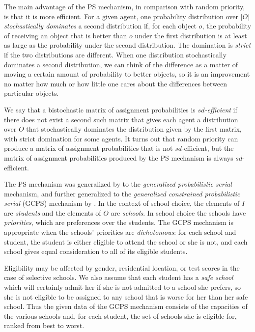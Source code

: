 \documentclass[12pt]{article}
\theoremstyle{definition}
\begin{document}
The main advantage of the PS mechanism, in comparison with random
priority, is that it is more efficient.  For a given agent, one
probability distribution over $|O|$ \emph{stochastically dominates} a
second distribution if, for each object $o$, the probability of
receiving an object that is better than $o$ under the first
distribution is at least as large as the probability under the second
distribution.  The domination is \emph{strict} if the two
distributions are different. When one distribution stochastically
dominates a second distribution, we can think of the difference as a
matter of moving a certain amount of probability to better objects, so
it is an improvement no matter how much or how little one cares about
the differences between particular objects.

We say that a bistochastic matrix of assignment probabilities is
\emph{$sd$-efficient} if there does not exist a second such matrix
that gives each agent a distribution over $O$ that stochastically
dominates the distribution given by the first matrix, with strict
domination for some agents.  It turns out that random priority can
produce a matrix of assignment probabilities that is not
$sd$-efficient, but the matrix of assignment probabilities produced by
the PS mechanism is always $sd$-efficient.

The PS mechanism was generalized by \cite{bckm13aer} to the
\emph{generalized probabilistic serial} mechanism, and further
generalized to the \emph{generalized constrained probabilistic serial}
(GCPS) mechanism by \cite{balbuzanov22jet}.  In the context of school
choice, the elements of $I$ are \emph{students} and the elements of
$O$ are \emph{schools}.  In school choice the schools have
\emph{priorities}, which are preferences over the students.  The GCPS
mechanism is appropriate when the schools' priorities are
\emph{dichotomous}: for each school and student, the student is either
eligible to attend the school or she is not, and each school gives
equal consideration to all of its eligible students.

Eligibility may be affected by gender, residential location, or test
scores in the case of selective schools.  We also assume that each
student has a \emph{safe school} which will certainly admit her if she
is not admitted to a school she prefers, so she is not eligible to be
assigned to any school that is worse for her than her safe school.
Thus the given data of the GCPS mechanism consists of the capacities
of the various schools and, for each student, the set of schools she
is eligible for, ranked from best to worst.
\end{document}
